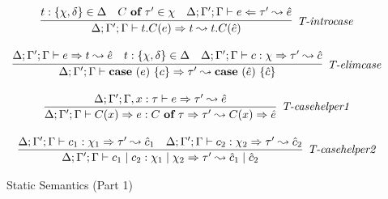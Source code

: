 \begin{figure}
\[\begin{array}{c}
\infer[\textit{T-introcase}]
	{\Delta; \Gamma'; \Gamma \vdash  t.C(e) \Rightarrow t  \leadsto t.C(\hat{e}) } 
	{t:\{\chi, \delta\} \in \Delta & C\ \keyw{of}\ \tau' \in \chi &\Delta; \Gamma'; \Gamma \vdash e \Leftarrow \tau'  \leadsto \hat{e}}\\[3ex]

\infer[\textit{T-elimcase}]
	{\Delta; \Gamma'; \Gamma \vdash  \keyw{case}~(e)~\{ c \} \Rightarrow \tau'  \leadsto \keyw{case}~(\hat{e})~\{ \hat{c} \} } 
	{\Delta; \Gamma'; \Gamma \vdash e \Rightarrow t  \leadsto \hat{e}  & t:\{ \chi,\delta\} \in \Delta & \Delta; \Gamma'; \Gamma \vdash c:\chi \Rightarrow \tau' \leadsto \hat{c}}\\[3ex]

\infer[\textit{T-casehelper1}]
	{\Delta; \Gamma'; \Gamma \vdash  C(x)\Rightarrow e : C\ \keyw{of}\ \tau \Rightarrow \tau' \leadsto C(x)\Rightarrow \hat{e}} 
	{\Delta; \Gamma'; \Gamma, x:\tau \vdash e \Rightarrow \tau' \leadsto \hat{e}}\\[3ex]

\infer[\textit{T-casehelper2}]
	{\Delta; \Gamma'; \Gamma \vdash  c_1 \bnfalt c_2: \chi_1 \bnfalt \chi_2 \Rightarrow \tau' \leadsto \hat{c}_1 \bnfalt \hat{c}_2 } 
	{\Delta; \Gamma'; \Gamma \vdash c_1:\chi_1 \Rightarrow \tau' \leadsto \hat{c}_1 & \Delta; \Gamma'; \Gamma \vdash c_2:\chi_2 \Rightarrow \tau' \leadsto \hat{c}_2}
\end{array}
\]
\label{fig:statics1}
\caption{Static Semantics  (Part 1)}
\end{figure}

